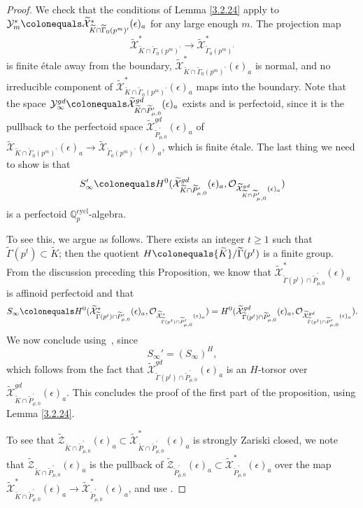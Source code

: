\documentclass{amsart}
\theoremstyle{remark}
\numberwithin{equation}{subsection}
\newcommand{\Q}{\QQ}
\newcommand{\QQ}{{\mathbb Q}}
\newcommand{\cO}{{\mathcal O}}
\newcommand{\cX}{{\mathcal X}}
\newcommand{\cY}{{\mathcal Y}}
\newcommand{\cZ}{{\mathcal Z}}
\newcommand{\cycl}{\mathrm{cycl}}
\newcommand{\tGam}{\widetilde{\Gamma}}
\newcommand{\tK}{{\widetilde{K}}}
\newcommand{\tP}{\widetilde{P}}
\newcommand{\wt}{\widetilde}
\newcommand{\defeq}{\colonequals}
\renewcommand{\(}{\left(}
\renewcommand{\)}{\right)}
\begin{document}
\begin{proof} We check that the conditions of Lemma \ref{3.2.24} apply to $\cY_m^\ast\defeq \wt{\cX}^{\ast}_{\tK \cap \tGam_0(p^m)^{\prime}}(\epsilon)_a$ for any large enough $m$. The projection map 
\[
\wt{\cX}^{\ast}_{\tK \cap \tGam_0(p^m)^{\prime}} \to \wt{\cX}^{\ast}_{\tGam_0(p^m)^{\prime}}
\]
is finite \'etale away from the boundary, $\wt{\cX}^{\ast}_{\tK \cap \tGam_0(p^m)^{\prime}}(\epsilon)_a$ is normal, 
and no irreducible component of $\wt{\cX}^{\ast}_{\tK \cap \tGam_0(p^m)^{\prime}}(\epsilon)_a$ maps into the boundary. 
Note that the space $\cY_{\infty}^{gd}\defeq \wt{\cX}^{gd}_{\tK \cap \tP_{\mu,0}^{\prime}}(\epsilon)_a$ exists and is perfectoid, since it is the pullback to the perfectoid space $\wt{\cX}^{gd}_{\tP_{\mu,0}^{\prime}}(\epsilon)_a$ of $\wt{\cX}_{\tK \cap \tGam_0(p^m)^{\prime}}(\epsilon)_a \to  \wt{\cX}_{\tGam_0(p^m)^{\prime}}(\epsilon)_a$,
which is finite \'etale. The last thing we need to show is that 
\[
S_\infty'\defeq H^0(\wt{\cX}^{gd}_{\tK \cap \tP_{\mu,0}^{\prime}}(\epsilon)_a, \cO_{\wt{\cX}^{gd}_{\tK \cap \tP_{\mu,0}^{\prime}}(\epsilon)_a})
\]
is a perfectoid $\Q_p^\cycl$-algebra. 

\medskip
To see this, we argue as follows. There exists an integer $t\geq 1$ such that $\tGam(p^t) \subset \tK$; then
the quotient $H\defeq \tK /\tGam(p^t)$ is a finite group. From the discussion preceding this Proposition, we know that $\wt{\cX}^{\ast}_{\tGam(p^t) \cap \tP_{\mu,0}^{\prime}}(\epsilon)_a$
is affinoid perfectoid and that
\[
 S_{\infty} \defeq H^{0}(\wt{\cX}^{\ast}_{\tGam(p^t) \cap \tP_{\mu,0}^{\prime}}(\epsilon)_{a},\cO_{\wt{\cX}^{\ast}_{\tGam(p^{t}) \cap \tP_{\mu,0}^{\prime}}(\epsilon)_{a}}) = H^{0}(\wt{\cX}^{gd}_{\tGam(p^t) \cap \tP_{\mu,0}^{\prime}}(\epsilon)_{a},\cO_{\wt{\cX}^{gd}_{\tGam(p^t) \cap \tP_{\mu,0}^{\prime}}(\epsilon)_{a}}).
\]
We now conclude using~\cite[Prop. 3.6.22]{kedlaya-liu}, since 
\[
S_\infty' = (S_\infty)^H,
\]
which follows from the fact that $\wt{\cX}^{gd}_{\tGam(p^t) \cap \tP_{\mu,0}^{\prime}}(\epsilon)_a$ is an $H$-torsor over $\wt{\cX}^{gd}_{\tK \cap \tP_{\mu,0}^{\prime}}(\epsilon)_a$. This concludes the proof of the first part of the proposition, using Lemma \ref{3.2.24}.

\medskip

To see that $\wt{\cZ}_{\tK \cap \tP_{\mu,0}^{\prime}}(\epsilon)_a\subset \wt{\cX}^{\ast}_{\tK \cap \tP_{\mu,0}^{\prime}}(\epsilon)_a$ is strongly Zariski closed, we note that $\wt{\cZ}_{\tK \cap \tP_{\mu,0}^{\prime}}(\epsilon)_a$ is the pullback of $\wt{\cZ}_{\tP_{\mu,0}^{\prime}}(\epsilon)_a \subset \wt{\cX}^{\ast}_{\tP_{\mu,0}^{\prime}}(\epsilon)_a$ over the map $\wt{\cX}^{\ast}_{\tK \cap \tP_{\mu,0}^{\prime}}(\epsilon)_a \to \wt{\cX}^{\ast}_{\tP_{\mu,0}^{\prime}}(\epsilon)_a$, and use \cite[Lemma 2.2.9]{scholze-galois}.
\end{proof}
\end{document}
